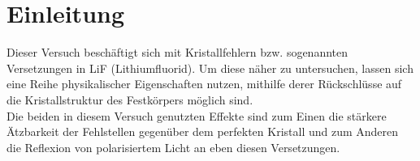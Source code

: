 ﻿\section{Einleitung}
Dieser Versuch beschäftigt sich mit Kristallfehlern bzw. sogenannten Versetzungen in LiF (Lithiumfluorid). Um diese
näher zu untersuchen, lassen sich eine Reihe physikalischer Eigenschaften nutzen, mithilfe derer Rückschlüsse auf die Kristallstruktur des
Festkörpers möglich sind.\\
Die beiden in diesem Versuch genutzten Effekte sind zum Einen die stärkere Ätzbarkeit der Fehlstellen gegenüber dem perfekten Kristall und zum Anderen
die Reflexion von polarisiertem Licht an eben diesen Versetzungen.
